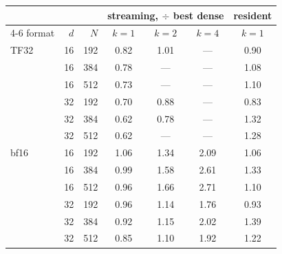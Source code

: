 \begin{tabular}{lrrcccc}
\toprule
& & & \multicolumn{3}{c}{\textbf{streaming}, $\div$ best dense} & \textbf{resident} \\
\cmidrule(lr){4-6}
format & $d$ & $N$ & $k{=}1$ & $k{=}2$ & $k{=}4$ & $k{=}1$ \\
\midrule
TF32 & 16 & 192 & 0.82 & 1.01 & --- & 0.90 \\
 & 16 & 384 & 0.78 & --- & --- & 1.08 \\
 & 16 & 512 & 0.73 & --- & --- & 1.10 \\
 & 32 & 192 & 0.70 & 0.88 & --- & 0.83 \\
 & 32 & 384 & 0.62 & 0.78 & --- & 1.32 \\
 & 32 & 512 & 0.62 & --- & --- & 1.28 \\
\midrule
bf16 & 16 & 192 & 1.06 & 1.34 & 2.09 & 1.06 \\
 & 16 & 384 & 0.99 & 1.58 & 2.61 & 1.33 \\
 & 16 & 512 & 0.96 & 1.66 & 2.71 & 1.10 \\
 & 32 & 192 & 0.96 & 1.14 & 1.76 & 0.93 \\
 & 32 & 384 & 0.92 & 1.15 & 2.02 & 1.39 \\
 & 32 & 512 & 0.85 & 1.10 & 1.92 & 1.22 \\
\bottomrule
\end{tabular}%

